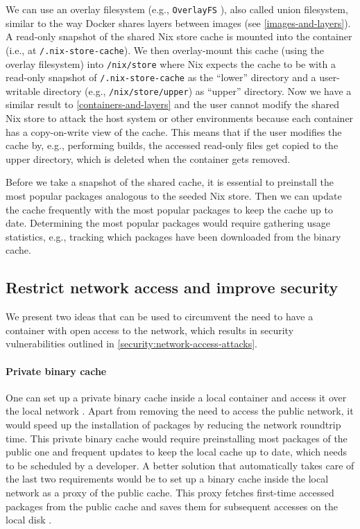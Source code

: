 We can use an overlay filesystem (e.g., \verb|OverlayFS| \cite{OverlayFS}), also called union filesystem, similar to the way Docker shares layers between images (see \ref{images-and-layers}). A read-only snapshot of the shared Nix store cache is mounted into the container (i.e., at \verb|/.nix-store-cache|). We then overlay-mount this cache (using the overlay filesystem) into \verb|/nix/store| where Nix expects the cache to be with a read-only snapshot of \verb|/.nix-store-cache| as the ``lower'' directory and a user-writable directory (e.g., \verb|/nix/store/upper|) as ``upper'' directory. Now we have a similar result to \ref{containers-and-layers} and the user cannot modify the shared Nix store to attack the host system or other environments because each container has a copy-on-write view of the cache. This means that if the user modifies the cache by, e.g., performing builds, the accessed read-only files get copied to the upper directory, which is deleted when the container gets removed.

Before we take a snapshot of the shared cache, it is essential to preinstall the most popular packages analogous to the seeded Nix store. Then we can update the cache frequently with the most popular packages to keep the cache up to date. Determining the most popular packages would require gathering usage statistics, e.g., tracking which packages have been downloaded from the binary cache.

\subsection{Restrict network access and improve security}\label{restrict-network-security}
We present two ideas that can be used to circumvent the need to have a container with open access to the network, which results in security vulnerabilities outlined in \ref{security:network-access-attacks}. 

\paragraph{Private binary cache}
One can set up a private binary cache inside a local container and access it over the local network \cite{NixBinaryCache}. Apart from removing the need to access the public network, it would speed up the installation of packages by reducing the network roundtrip time. This private binary cache would require preinstalling most packages of the public one and frequent updates to keep the local cache up to date, which needs to be scheduled by a developer. A better solution that automatically takes care of the last two requirements would be to set up a binary cache inside the local network as a proxy of the public cache. This proxy fetches first-time accessed packages from the public cache and saves them for subsequent accesses on the local disk \cite{NixBinaryCacheProxy}.

